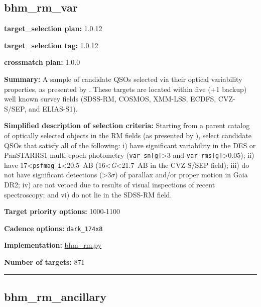 \hypertarget{bhm_rm_var_plan1.0.12}{%
\subsection{bhm\_rm\_var}\label{bhm_rm_var_plan1.0.12}}

\noindent\textbf{target\_selection plan:} 1.0.12

\noindent\textbf{target\_selection tag:}
\href{https://github.com/sdss/target_selection/tree/1.0.12/}{1.0.12}

\noindent\textbf{crossmatch plan:} 1.0.0

\noindent\textbf{Summary:} A sample of candidate QSOs selected via their optical
variability properties, as presented by
\citet{Yang2022}. These targets are located within five (+1 backup) well
known survey fields (SDSS-RM, COSMOS, XMM-LSS, ECDFS, CVZ-S/SEP, and
ELIAS-S1).

\noindent\textbf{Simplified description of selection criteria:} Starting from a
parent catalog of optically selected objects in the RM fields (as
presented by
\citealt{Yang2022}), select candidate QSOs that satisfy all of the
following: i) have significant variability in the DES or PanSTARRS1
multi-epoch photometry (\texttt{var\_sn{[}g{]}}\textgreater3 and
\texttt{var\_rms{[}g{]}}\textgreater0.05); ii) have
17\textless{}\texttt{psfmag\_i}\textless20.5~AB
(16\textless{}\emph{G}\textless21.7~AB in the CVZ-S/SEP field); iii) do
not have significant detections (\textgreater3$\sigma$) of parallax and/or
proper motion in Gaia DR2; iv) are not vetoed due to results of visual
inspections of recent spectroscopy; and vi) do not lie in the SDSS-RM
field.


\noindent\textbf{Target priority options:} 1000-1100

\noindent\textbf{Cadence options:} \texttt{dark\_174x8}

\noindent\textbf{Implementation:}
\href{https://github.com/sdss/target_selection/blob/1.0.12/python/target_selection/cartons/bhm_rm.py}{bhm\_rm.py}

\noindent\textbf{Number of targets:} 871

\begin{center}\rule{0.5\linewidth}{0.5pt}\end{center}

\hypertarget{bhm_rm_ancillary_plan1.0.12}{%
\subsection{bhm\_rm\_ancillary}\label{bhm_rm_ancillary_plan1.0.12}}

